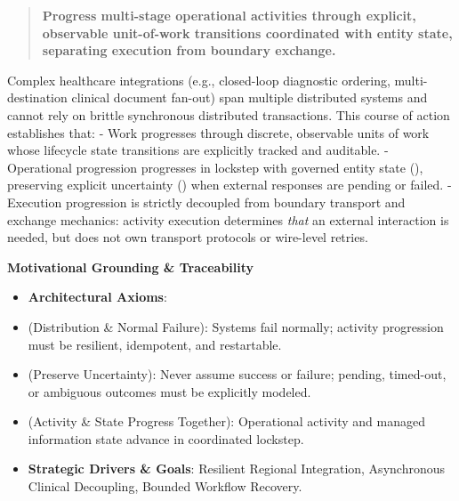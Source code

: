 \begin{quote}


\textbf{Progress multi-stage operational activities through explicit, observable unit-of-work transitions coordinated with entity state, separating execution from boundary exchange.}



\end{quote}


Complex healthcare integrations (e.g., closed-loop diagnostic ordering, multi-destination clinical document fan-out) span multiple distributed systems and cannot rely on brittle synchronous distributed transactions. This course of action establishes that:
- Work progresses through discrete, observable units of work whose lifecycle state transitions are explicitly tracked and auditable.
- Operational progression progresses in lockstep with governed entity state (\texttt{}), preserving explicit uncertainty (\texttt{}) when external responses are pending or failed.
- Execution progression is strictly decoupled from boundary transport and exchange mechanics: activity execution determines \emph{that} an external interaction is needed, but does not own transport protocols or wire-level retries.



\par\medskip\textbf{Motivational Grounding \& Traceability}\par


\begin{itemize}


\item \textbf{Architectural Axioms}:

\item \texttt{} (Distribution \& Normal Failure): Systems fail normally; activity progression must be resilient, idempotent, and restartable.

\item \texttt{} (Preserve Uncertainty): Never assume success or failure; pending, timed-out, or ambiguous outcomes must be explicitly modeled.

\item \texttt{} (Activity \& State Progress Together): Operational activity and managed information state advance in coordinated lockstep.

\item \textbf{Strategic Drivers \& Goals}: Resilient Regional Integration, Asynchronous Clinical Decoupling, Bounded Workflow Recovery.

\end{itemize}


